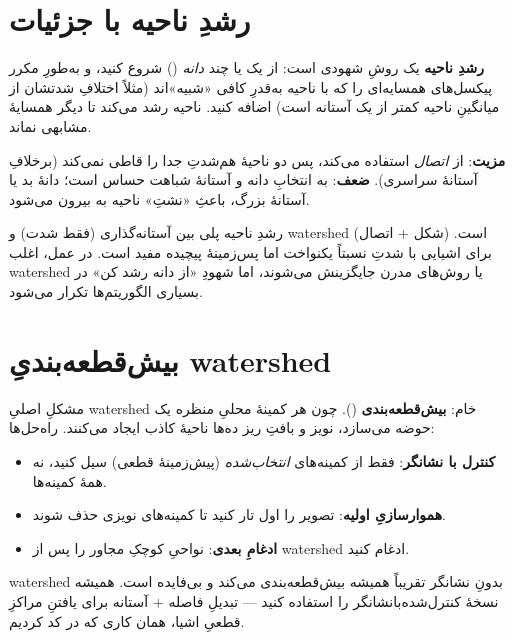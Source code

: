 \documentclass[12pt,a4paper]{article}
\begin{document}
\section{رشدِ ناحیه با جزئیات}

\textbf{رشدِ ناحیه} یک روشِ شهودی است: از یک یا چند \emph{دانه} () شروع کنید، و به‌طورِ
مکرر پیکسل‌های همسایه‌ای را که با ناحیه به‌قدرِ کافی «شبیه»‌اند (مثلاً اختلافِ شدتشان از میانگینِ
ناحیه کمتر از یک آستانه است) اضافه کنید. ناحیه رشد می‌کند تا دیگر همسایهٔ مشابهی نماند.

\textbf{مزیت}: از \emph{اتصال} استفاده می‌کند، پس دو ناحیهٔ هم‌شدتِ جدا را قاطی نمی‌کند (برخلافِ
آستانهٔ سراسری). \textbf{ضعف}: به انتخابِ دانه و آستانهٔ شباهت حساس است؛ دانهٔ بد یا آستانهٔ بزرگ،
باعثِ «نشتِ» ناحیه به بیرون می‌شود.

\begin{nokte}
رشدِ ناحیه پلی بین آستانه‌گذاری (فقط شدت) و watershed (شکل + اتصال) است. برای اشیایی با شدتِ
نسبتاً یکنواخت اما پس‌زمینهٔ پیچیده مفید است. در عمل، اغلب watershed یا روش‌های مدرن جایگزینش
می‌شوند، اما شهودِ «از دانه رشد کن» در بسیاری الگوریتم‌ها تکرار می‌شود.
\end{nokte}

\section{بیش‌قطعه‌بندیِ watershed}

مشکلِ اصلیِ watershedِ خام: \textbf{بیش‌قطعه‌بندی} (). چون هر کمینهٔ محلیِ
منظره یک حوضه می‌سازد، نویز و بافتِ ریز ده‌ها ناحیهٔ کاذب ایجاد می‌کنند. راه‌حل‌ها:

\begin{itemize}
  \item \textbf{کنترل با نشانگر}: فقط از کمینه‌های \emph{انتخاب‌شده} (پیش‌زمینهٔ قطعی) سیل کنید، نه همهٔ کمینه‌ها.
  \item \textbf{هموارسازیِ اولیه}: تصویر را اول تار کنید تا کمینه‌های نویزی حذف شوند.
  \item \textbf{ادغامِ بعدی}: نواحیِ کوچکِ مجاور را پس از watershed ادغام کنید.
\end{itemize}

\begin{hoshdar}
watershedِ بدونِ نشانگر تقریباً همیشه بیش‌قطعه‌بندی می‌کند و بی‌فایده است. همیشه نسخهٔ
کنترل‌شده‌با‌نشانگر را استفاده کنید — تبدیلِ فاصله + آستانه برای یافتنِ مراکزِ قطعیِ اشیا، همان
کاری که در کد کردیم.
\end{hoshdar}
\end{document}
